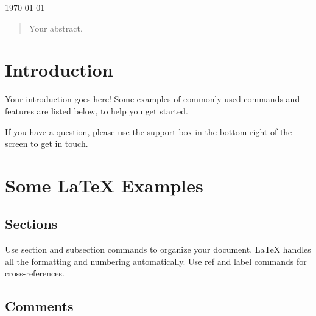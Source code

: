 \begin{titlepage}

{\large \today}\\[2cm] %


 

\vfill %

\end{titlepage}


\begin{abstract}
Your abstract.
\end{abstract}

\section{Introduction}

Your introduction goes here! Some examples of commonly used commands and features are listed below, to help you get started.

If you have a question, please use the support box in the bottom right of the screen to get in touch. 

\section{Some \LaTeX{} Examples}
\label{sec:examples}

\subsection{Sections}

Use section and subsection commands to organize your document. \LaTeX{} handles all the formatting and numbering automatically. Use ref and label commands for cross-references.

\subsection{Comments}

